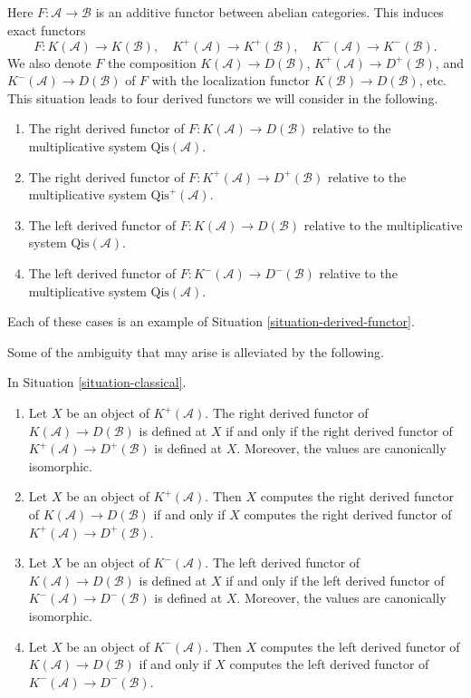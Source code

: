 \begin{situation}
\label{situation-classical}
Here $F : \mathcal{A} \to \mathcal{B}$ is an additive functor between
abelian categories. This induces exact functors
$$
F : K(\mathcal{A}) \to K(\mathcal{B}),\quad
K^{+}(\mathcal{A}) \to K^{+}(\mathcal{B}),\quad
K^{-}(\mathcal{A}) \to K^{-}(\mathcal{B}).
$$
We also denote $F$ the composition $K(\mathcal{A}) \to D(\mathcal{B})$,
$K^{+}(\mathcal{A}) \to D^{+}(\mathcal{B})$, and
$K^{-}(\mathcal{A}) \to D(\mathcal{B})$ of $F$ with the localization
functor $K(\mathcal{B}) \to D(\mathcal{B})$, etc. This situation leads
to four derived functors we will consider in the following.
\begin{enumerate}
\item The right derived functor of
$F : K(\mathcal{A}) \to D(\mathcal{B})$
relative to the multiplicative system $\text{Qis}(\mathcal{A})$.
\item The right derived functor of
$F : K^{+}(\mathcal{A}) \to D^{+}(\mathcal{B})$
relative to the multiplicative system $\text{Qis}^{+}(\mathcal{A})$.
\item The left derived functor of
$F : K(\mathcal{A}) \to D(\mathcal{B})$
relative to the multiplicative system $\text{Qis}(\mathcal{A})$.
\item The left derived functor of
$F : K^{-}(\mathcal{A}) \to D^{-}(\mathcal{B})$
relative to the multiplicative system $\text{Qis}(\mathcal{A})$.
\end{enumerate}
Each of these cases is an example of
Situation \ref{situation-derived-functor}.
\end{situation}

\noindent
Some of the ambiguity that may arise is alleviated by the following.

\begin{lemma}
\label{lemma-irrelevant}
In
Situation \ref{situation-classical}.
\begin{enumerate}
\item Let $X$ be an object of $K^{+}(\mathcal{A})$.
The right derived functor of $K(\mathcal{A}) \to D(\mathcal{B})$
is defined at $X$ if and only if the right derived functor of
$K^{+}(\mathcal{A}) \to D^{+}(\mathcal{B})$ is defined at $X$.
Moreover, the values are canonically isomorphic.
\item Let $X$ be an object of $K^{+}(\mathcal{A})$.
Then $X$ computes the right derived functor of
$K(\mathcal{A}) \to D(\mathcal{B})$
if and only if $X$ computes the right derived functor of
$K^{+}(\mathcal{A}) \to D^{+}(\mathcal{B})$.
\item Let $X$ be an object of $K^{-}(\mathcal{A})$.
The left derived functor of $K(\mathcal{A}) \to D(\mathcal{B})$
is defined at $X$ if and only if the left derived functor of
$K^{-}(\mathcal{A}) \to D^{-}(\mathcal{B})$ is defined at $X$.
Moreover, the values are canonically isomorphic.
\item Let $X$ be an object of $K^{-}(\mathcal{A})$.
Then $X$ computes the left derived functor of
$K(\mathcal{A}) \to D(\mathcal{B})$ if and only if $X$ computes
the left derived functor of $K^{-}(\mathcal{A}) \to D^{-}(\mathcal{B})$.
\end{enumerate}
\end{lemma}

